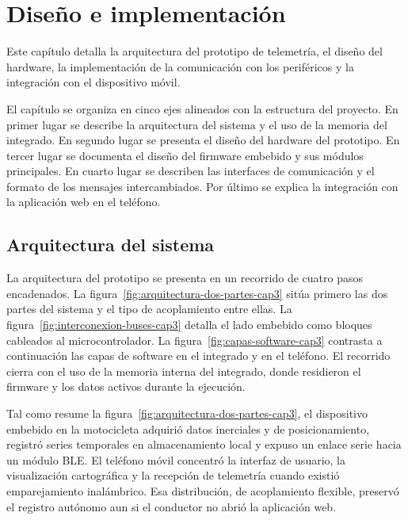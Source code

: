\chapter{Diseño e implementación}

\label{Chapter3}

Este capítulo detalla la arquitectura del prototipo de telemetría, el diseño del hardware, la implementación de la comunicación con los periféricos y la integración con el dispositivo móvil.

El capítulo se organiza en cinco ejes alineados con la estructura del proyecto. En primer lugar se describe la arquitectura del sistema y el uso de la memoria del integrado. En segundo lugar se presenta el diseño del hardware del prototipo. En tercer lugar se documenta el diseño del firmware embebido y sus módulos principales. En cuarto lugar se describen las interfaces de comunicación y el formato de los mensajes intercambiados. Por último se explica la integración con la aplicación web en el teléfono.

\section{Arquitectura del sistema}
\label{sec:arquitectura-sistema}

La arquitectura del prototipo se presenta en un recorrido de cuatro pasos encadenados. La figura~\ref{fig:arquitectura-dos-partes-cap3} sitúa primero las dos partes del sistema y el tipo de acoplamiento entre ellas. La figura~\ref{fig:interconexion-buses-cap3} detalla el lado embebido como bloques cableados al microcontrolador. La figura~\ref{fig:capas-software-cap3} contrasta a continuación las capas de software en el integrado y en el teléfono. El recorrido cierra con el uso de la memoria interna del integrado, donde residieron el firmware y los datos activos durante la ejecución.

Tal como resume la figura~\ref{fig:arquitectura-dos-partes-cap3}, el dispositivo embebido en la motocicleta adquirió datos inerciales y de posicionamiento, registró series temporales en almacenamiento local y expuso un enlace serie hacia un módulo BLE. El teléfono móvil concentró la interfaz de usuario, la visualización cartográfica y la recepción de telemetría cuando existió emparejamiento inalámbrico. Esa distribución, de acoplamiento flexible, preservó el registro autónomo aun si el conductor no abrió la aplicación web.

